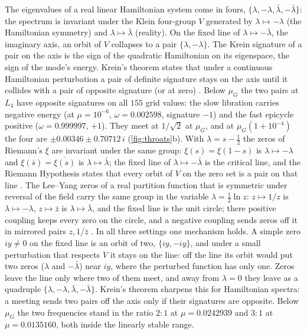 \documentclass[11pt]{article}
\theoremstyle{definition}\newtheorem{definition}[theorem]{Definition}
\theoremstyle{remark}\newtheorem{remark}[theorem]{Remark}
\begin{document}
The eigenvalues of a real linear Hamiltonian system come in fours, $\{\lambda,-\lambda,\bar\lambda,-\bar\lambda\}$: the spectrum is invariant under the Klein four-group $V$ generated by $\lambda\mapsto-\lambda$ (the Hamiltonian symmetry) and $\lambda\mapsto\bar\lambda$ (reality). On the fixed line of $\lambda\mapsto-\bar\lambda$, the imaginary axis, an orbit of $V$ collapses to a pair $\{\lambda,-\lambda\}$. The Krein signature of a pair on the axis is the sign of the quadratic Hamiltonian on its eigenspace, the sign of the mode's energy. Krein's theorem states that under a continuous Hamiltonian perturbation a pair of definite signature stays on the axis until it collides with a pair of opposite signature (or at zero) \cite{MHO}. Below $\mu_G$ the two pairs at $L_4$ have opposite signatures on all $155$ grid values: the slow libration carries negative energy (at $\mu=10^{-6}$, $\omega=0.002598$, signature $-1$) and the fast epicycle positive ($\omega=0.999997$, $+1$). They meet at $1/\sqrt2$ at $\mu_G$, and at $\mu_G(1+10^{-4})$ the four are $\pm0.00346\pm0.70712\,i$ (\cref{fig:throats}b). With $\lambda=s-\frac12$ the zeros of Riemann's $\xi$ are invariant under the same group: $\xi(s)=\xi(1-s)$ is $\lambda\mapsto-\lambda$ and $\xi(\bar s)=\overline{\xi(s)}$ is $\lambda\mapsto\bar\lambda$; the fixed line of $\lambda\mapsto-\bar\lambda$ is the critical line, and the Riemann Hypothesis states that every orbit of $V$ on the zero set is a pair on that line \cite{SMath}. The Lee--Yang zeros of a real partition function that is symmetric under reversal of the field carry the same group in the variable $\lambda=\frac12\ln z$: $z\mapsto1/z$ is $\lambda\mapsto-\lambda$, $z\mapsto\bar z$ is $\lambda\mapsto\bar\lambda$, and the fixed line is the unit circle; there positive coupling keeps every zero on the circle, and a negative coupling sends zeros off it in mirrored pairs $z,1/\bar z$ \cite{SQuant}. In all three settings one mechanism holds. A simple zero $iy\ne0$ on the fixed line is an orbit of two, $\{iy,-iy\}$, and under a small perturbation that respects $V$ it stays on the line: off the line its orbit would put two zeros ($\lambda$ and $-\bar\lambda$) near $iy$, where the perturbed function has only one. Zeros leave the line only where two of them meet, and away from $\lambda=0$ they leave as a quadruple $\{\lambda,-\lambda,\bar\lambda,-\bar\lambda\}$. Krein's theorem sharpens this for Hamiltonian spectra: a meeting sends two pairs off the axis only if their signatures are opposite. Below $\mu_G$ the two frequencies stand in the ratio $2{:}1$ at $\mu=0.0242939$ and $3{:}1$ at $\mu=0.0135160$, both inside the linearly stable range.
\end{document}
